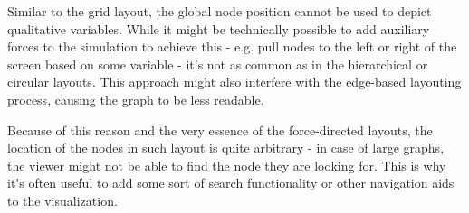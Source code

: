 \begin{itemize}
    Similar to the grid layout, the global node position cannot be used to depict qualitative variables. While it might be technically possible 
    to add auxiliary forces to the simulation to achieve this - e.g. pull nodes to the left or right of the screen based on some variable - 
    it's not as common as in the hierarchical or circular layouts. This approach might also interfere with the edge-based layouting process,
    causing the graph to be less readable.

    Because of this reason and the very essence of the force-directed layouts, the location of the nodes in such layout is quite arbitrary 
    - in case of large graphs, the viewer might not be able to find the node they are looking for. This is why it's often useful to add 
    some sort of search functionality or other navigation aids to the visualization.
\end{itemize}
